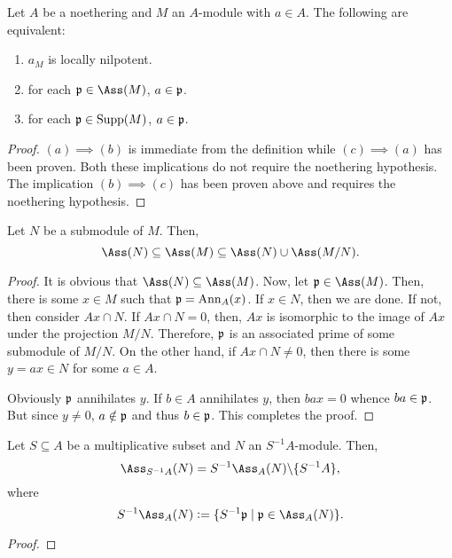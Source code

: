 \begin{corollary}
    Let $A$ be a noethering and $M$ an $A$-module with $a\in A$. The following are equivalent: 
    \begin{enumerate}[label=(\alph*)]
        \item $a_M$ is locally nilpotent. 
        \item for each $\frakp\in\Ass(M)$, $a\in\mathfrak p$.
        \item for each $\mathfrak p\in\operatorname{Supp}(M)$, $a\in\mathfrak p$.
    \end{enumerate}
\end{corollary}
\begin{proof}
    $(a)\implies(b)$ is immediate from the definition while $(c)\implies(a)$ has been proven. Both these implications do not require the noethering hypothesis. The implication $(b)\implies(c)$ has been proven above and requires the noethering hypothesis.
\end{proof}

\begin{lemma}
    Let $N$ be a submodule of $M$. Then, 
    \begin{equation*}
        \Ass(N)\subseteq\Ass(M)\subseteq\Ass(N)\cup\Ass(M/N).
    \end{equation*}
\end{lemma}
\begin{proof}
    It is obvious that $\Ass(N)\subseteq\Ass(M)$. Now, let $\frakp\in\Ass(M)$. Then, there is some $x\in M$ such that $\mathfrak p = \operatorname{Ann}_A(x)$. If $x\in N$, then we are done. If not, then consider $Ax\cap N$. If $Ax\cap N = 0$, then, $Ax$ is isomorphic to the image of $Ax$ under the projection $M/N$. Therefore, $\mathfrak p$ is an associated prime of some submodule of $M/N$. On the other hand, if $Ax\cap N\ne 0$, then there is some $y = ax\in N$ for some $a\in A$. 

    Obviously $\mathfrak p$ annihilates $y$. If $b\in A$ annihilates $y$, then $bax = 0$ whence $ba\in\mathfrak p$. But since $y\ne 0$, $a\notin\mathfrak p$ and thus $b\in\mathfrak p$. This completes the proof.
\end{proof}

\begin{lemma}
    Let $S\subseteq A$ be a multiplicative subset and $N$ an $S^{-1}A$-module. Then, 
    \begin{equation*}
        \Ass_{S^{-1} A}(N) = S^{-1}\Ass_A(N)\backslash\{S^{-1}A\},
    \end{equation*}
    where 
    \begin{equation*}
        S^{-1}\Ass_A(N) := \{S^{-1}\frakp\mid\frakp\in\Ass_A(N)\}.
    \end{equation*}
\end{lemma}
\begin{proof}
\end{proof}

